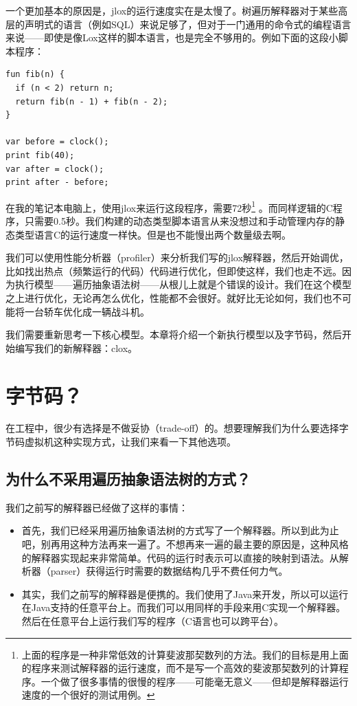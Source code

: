\documentclass[cn,10pt,math=newtx,citestyle=gb7714-2015,bibstyle=gb7714-2015]{elegantbook}
\begin{document}
一个更加基本的原因是，jlox的运行速度实在是太慢了。树遍历解释器对于某些高层的声明式的语言（例如SQL）来说足够了，但对于一门通用的命令式的编程语言来说——即使是像Lox这样的脚本语言，也是完全不够用的。例如下面的这段小脚本程序：

\begin{verbatim}
fun fib(n) {
  if (n < 2) return n;
  return fib(n - 1) + fib(n - 2); 
}

var before = clock();
print fib(40);
var after = clock();
print after - before;
\end{verbatim}

在我的笔记本电脑上，使用jlox来运行这段程序，需要72秒\footnote{上面的程序是一种非常低效的计算斐波那契数列的方法。我们的目标是用上面的程序来测试解释器的运行速度，而不是写一个高效的斐波那契数列的计算程序。一个做了很多事情的很慢的程序——可能毫无意义——但却是解释器运行速度的一个很好的测试用例。} 。而同样逻辑的C程序，只需要0.5秒。我们构建的动态类型脚本语言从来没想过和手动管理内存的静态类型语言C的运行速度一样快。但是也不能慢出两个数量级去啊。

我们可以使用性能分析器（profiler）来分析我们写的jlox解释器，然后开始调优，比如找出热点（频繁运行的代码）代码进行优化，但即使这样，我们也走不远。因为执行模型——遍历抽象语法树——从根儿上就是个错误的设计。我们在这个模型之上进行优化，无论再怎么优化，性能都不会很好。就好比无论如何，我们也不可能将一台轿车优化成一辆战斗机。

我们需要重新思考一下核心模型。本章将介绍一个新执行模型以及字节码，然后开始编写我们的新解释器：clox。

\section{字节码？}

在工程中，很少有选择是不做妥协（trade-off）的。想要理解我们为什么要选择字节码虚拟机这种实现方式，让我们来看一下其他选项。

\subsection{为什么不采用遍历抽象语法树的方式？}

我们之前写的解释器已经做了这样的事情：

\begin{itemize}
   \item 首先，我们已经采用遍历抽象语法树的方式写了一个解释器。所以到此为止吧，别再用这种方法再来一遍了。不想再来一遍的最主要的原因是，这种风格的解释器实现起来非常简单。代码的运行时表示可以直接的映射到语法。从解析器（parser）获得运行时需要的数据结构几乎不费任何力气。
   \item 其实，我们之前写的解释器是便携的。我们使用了Java来开发，所以可以运行在Java支持的任意平台上。而我们可以用同样的手段来用C实现一个解释器。然后在任意平台上运行我们写的程序（C语言也可以跨平台）。
\end{itemize}
\end{document}
